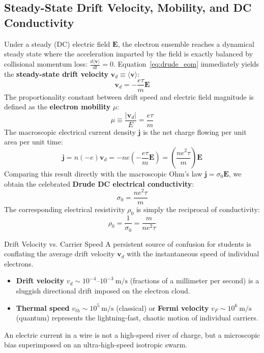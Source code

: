 \documentclass[11pt,a4paper]{article}
\newcommand{\vb}[1]{\mathbf{#1}}
\begin{document}
\subsection{Steady-State Drift Velocity, Mobility, and DC Conductivity}
Under a steady (DC) electric field $\vb{E}$, the electron ensemble reaches a dynamical steady state where the acceleration imparted by the field is exactly balanced by collisional momentum loss: $\frac{d\langle\vb{v}\rangle}{dt} = 0$. Equation~\eqref{eq:drude_eom} immediately yields the \textbf{steady-state drift velocity} $\vb{v}_d \equiv \langle\vb{v}\rangle$:
\begin{equation}
\vb{v}_d = -\frac{e\tau}{m}\vb{E}
\label{eq:drift_velocity}
\end{equation}
The proportionality constant between drift speed and electric field magnitude is defined as the \textbf{electron mobility} $\mu$:
\begin{equation}
\mu \equiv \frac{|\vb{v}_d|}{E} = \frac{e\tau}{m}
\label{eq:mobility}
\end{equation}
The macroscopic electrical current density $\vb{j}$ is the net charge flowing per unit area per unit time:
\begin{equation}
\vb{j} = n(-e)\vb{v}_d = -n e \left(-\frac{e\tau}{m}\vb{E}\right) = \left(\frac{n e^2 \tau}{m}\right)\vb{E}
\label{eq:current_density}
\end{equation}
Comparing this result directly with the macroscopic Ohm's law $\vb{j} = \sigma_0 \vb{E}$, we obtain the celebrated \textbf{Drude DC electrical conductivity}:
\begin{equation}
\boxed{\sigma_0 = \frac{n e^2 \tau}{m}}
\label{eq:drude_dc_sigma}
\end{equation}
The corresponding electrical resistivity $\rho_0$ is simply the reciprocal of conductivity:
\begin{equation}
\boxed{\rho_0 = \frac{1}{\sigma_0} = \frac{m}{n e^2 \tau}}
\label{eq:drude_dc_rho}
\end{equation}

\begin{pitfallbox}{Drift Velocity vs. Carrier Speed}
A persistent source of confusion for students is conflating the average drift velocity $\vb{v}_d$ with the instantaneous speed of individual electrons. 
\begin{itemize}
    \item \textbf{Drift velocity} $v_d \sim 10^{-4}\text{--}10^{-3}\ \mathrm{m/s}$ (fractions of a millimeter per second) is a sluggish directional drift imposed on the electron cloud.
    \item \textbf{Thermal speed} $v_{th} \sim 10^5\ \mathrm{m/s}$ (classical) or \textbf{Fermi velocity} $v_F \sim 10^6\ \mathrm{m/s}$ (quantum) represents the lightning-fast, chaotic motion of individual carriers.
\end{itemize}
An electric current in a wire is not a high-speed river of charge, but a microscopic bias superimposed on an ultra-high-speed isotropic swarm.
\end{pitfallbox}
\end{document}
